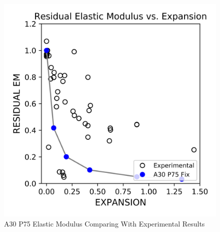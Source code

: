 \begin{figure}[ht!]
\centering
\includegraphics[width=.8\linewidth]{Files/CS_plot/ASREM1.png}
  \caption{A30 P75 Elastic Modulus Comparing With Experimental Results}
  \label{A30P75_EM_2}
\end{figure}

%



\clearpage

